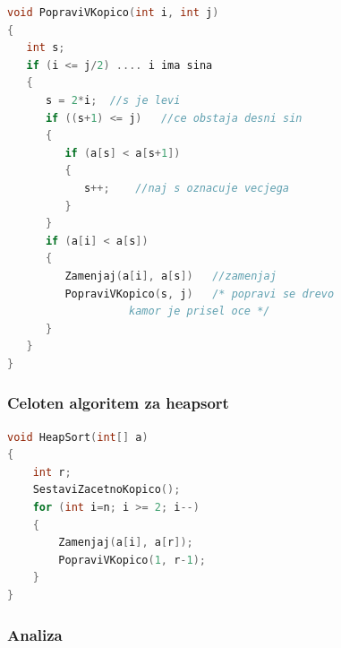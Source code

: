 \documentclass[a4paper,10pt]{article}
\begin{document}
\begin{lstlisting}[language={c}]
void PopraviVKopico(int i, int j)
{
   int s;
   if (i <= j/2) .... i ima sina
   {
      s = 2*i;	//s je levi
      if ((s+1) <= j)	//ce obstaja desni sin
      {
         if (a[s] < a[s+1])
         {
            s++;	//naj s oznacuje vecjega
         }
      }
      if (a[i] < a[s])
      {
         Zamenjaj(a[i], a[s])	//zamenjaj
         PopraviVKopico(s, j)	/* popravi se drevo
				   kamor je prisel oce */
      }
   }
}
\end{lstlisting}

\subsubsection{Celoten algoritem za heapsort}

\begin{lstlisting}[language={c}]
void HeapSort(int[] a)
{
	int r;
	SestaviZacetnoKopico();
	for (int i=n; i >= 2; i--)
	{
		Zamenjaj(a[i], a[r]);
		PopraviVKopico(1, r-1);
	}
}
\end{lstlisting}

\subsubsection{Analiza}
\end{document}
